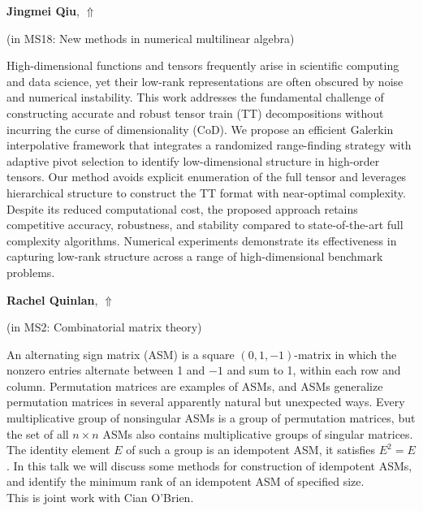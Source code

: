 \documentclass[ILAS2025-program.tex]{subfiles}
\begin{document}
\hypertarget{down0148}{}\begin{ilasabstract}
    
\textbf{Jingmei Qiu},  \hfill \hyperlink{up0148}{$\Uparrow$}
    
    
(in {\color{mstitle}MS18: New methods in numerical multilinear algebra})
        
\mtskip
    High-dimensional functions and tensors frequently arise in scientific computing and data science, yet their low-rank representations are often obscured by noise and numerical instability. This work addresses the fundamental challenge of constructing accurate and robust tensor train (TT) decompositions without incurring the curse of dimensionality (CoD). We propose an efficient Galerkin interpolative framework that integrates a randomized range-finding strategy with adaptive pivot selection to identify low-dimensional structure in high-order tensors. Our method avoids explicit enumeration of the full tensor and leverages hierarchical structure to construct the TT format with near-optimal complexity. Despite its reduced computational cost, the proposed approach retains competitive accuracy, robustness, and stability compared to state-of-the-art full complexity algorithms. Numerical experiments demonstrate its effectiveness in capturing low-rank structure across a range of high-dimensional benchmark problems.

\end{ilasabstract}
    

\hypertarget{down0141}{}\begin{ilasabstract}
    
\textbf{Rachel Quinlan},  \hfill \hyperlink{up0141}{$\Uparrow$}
    
    
(in {\color{mstitle}MS2: Combinatorial matrix theory})
        
\mtskip
    An alternating sign matrix (ASM) is a square $(0,1,-1)$-matrix in which the nonzero entries alternate between 1 and $-1$ and sum to 1, within each row and column. Permutation matrices are examples of ASMs, and ASMs generalize permutation matrices in several apparently natural but unexpected ways. Every multiplicative group of nonsingular ASMs is a group of permutation matrices, but the set of all $n\times n$ ASMs also contains multiplicative groups of singular matrices. The identity element $E$ of such a group is an idempotent ASM, it satisfies $E^2=E$. In this talk we will discuss some methods for construction of idempotent ASMs, and identify the minimum rank of an idempotent ASM of specified size. \\
This is joint work with Cian O'Brien.

\end{ilasabstract}
    
\end{document}
